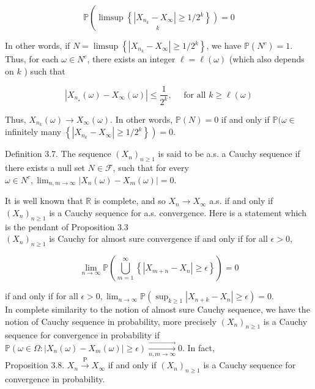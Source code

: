 \documentclass{amsbook}
\theoremstyle{plain}%
\theoremstyle{definition}
\theoremstyle{remark}
\begin{document}
$$
\mathbb{P}\left(\underset{k}{\left.\limsup \left\{\left|X_{n_{k}}-X_{\infty}\right| \geq 1 / 2^{k}\right\}\right)}=0\right.
$$

In other words, if $N=\limsup \left\{\left|X_{n_{k}}-X_{\infty}\right| \geq 1 / 2^{k}\right\}$, we have $\mathbb{P}\left(N^{c}\right)=1$. Thus, for each $\omega \in N^{c}$, there exists an integer $\ell=\ell(\omega)$ (which also depends on $k$ ) such that

$$
\left|X_{n_{\star}}(\omega)-X_{\infty}(\omega)\right| \leq \frac{1}{2^{k}}, \quad \text { for all } k \geq \ell(\omega)
$$

Thus, $X_{n_{k}}(\omega) \rightarrow X_{\infty}(\omega)$. In other words, $\mathbb{P}(N)=0$ if and only if $\mathbb{P}(\omega \in$ infinitely many $\left.\left\{\left|X_{n_{k}}-X_{\infty}\right| \geq 1 / 2^{k}\right\}\right)=0$.

Definition 3.7. The sequence $\left(X_{n}\right)_{n \geq 1}$ is said to be a.s. a Cauchy sequence if there exists a null set $N \in \mathcal{F}$, such that for every $\omega \in N^{c}, \lim _{n, m \rightarrow \infty}\left|X_{n}(\omega)-X_{m}(\omega)\right|=0$.

It is well known that $\mathbb{R}$ is complete, and so $X_{n} \rightarrow X_{\infty}$ a.s. if and only if $\left(X_{n}\right)_{n \geq 1}$ is a Cauchy sequence for a.s. convergence. Here is a statement which is the pendant of Proposition 3.3\\
$\left(X_{n}\right)_{n \geq 1}$ is Cauchy for almost sure convergence if and only if for all $\epsilon>0$,

$$
\lim _{n \rightarrow \infty} \mathbb{P}\left(\bigcup_{m=1}^{\infty}\left\{\left|X_{m+n}-X_{n}\right| \geq \epsilon\right\}\right)=0
$$

if and only if for all $\epsilon>0, \lim _{n \rightarrow \infty} \mathbb{P}\left(\sup _{k \geq 1}\left|X_{n+k}-X_{n}\right| \geq \epsilon\right)=0$.\\
In complete similarity to the notion of almost sure Cauchy sequence, we have the notion of Cauchy sequence in probability, more precisely $\left(X_{n}\right)_{n \geq 1}$ is a Cauchy sequence for convergence in probability if $\mathbb{P}\left(\omega \in \Omega:\left|X_{n}(\omega)-X_{m}(\omega)\right| \geq \epsilon\right) \xrightarrow[n, m \rightarrow \infty]{\longrightarrow} 0$. In fact,\\
Proposition 3.8. $X_{n} \xrightarrow{\mathrm{P}} X_{\infty}$ if and only if $\left(X_{n}\right)_{n \geq 1}$ is a Cauchy sequence for convergence in probability.
\end{document}
